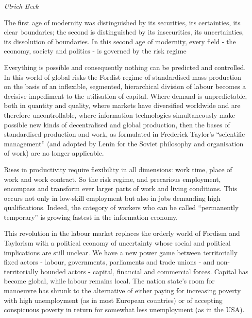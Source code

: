 \documentclass[
]{book}
\begin{document}
\emph{Ulrich Beck}

The first age of modernity was distinguished by its securities, its certainties, its clear boundaries; the second is distinguished by its insecurities, its uncertainties, its dissolution of boundaries. In this second age of modernity, every field - the economy, society and politics - is governed by the risk regime

Everything is possible and consequently nothing can be predicted and controlled. In this world of global risks the Fordist regime of standardised mass production on the basis of an inflexible, segmented, hierarchical division of labour becomes a decisive impediment to the utilisation of capital. Where demand is unpredictable, both in quantity and quality, where markets have diversified worldwide and are therefore uncontrollable, where information technologies simultaneously make possible new kinds of decentralised and global production, then the bases of standardised production and work, as formulated in Frederick Taylor's ``scientific management'' (and adopted by Lenin for the Soviet philosophy and organisation of work) are no longer applicable.

Rises in productivity require flexibility in all dimensions: work time, place of work and work contract. So the risk regime, and precarious employment, encompass and transform ever larger parts of work and living conditions. This occurs not only in low-skill employment but also in jobs demanding high qualifications. Indeed, the category of workers who can be called ``permanently temporary'' is growing fastest in the information economy.

This revolution in the labour market replaces the orderly world of Fordism and Taylorism with a political economy of uncertainty whose social and political implications are still unclear. We have a new power game between territorially fixed actors - labour, governments, parliaments and trade unions - and non-territorially bounded actors - capital, financial and commercial forces. Capital has become global, while labour remains local. The nation state's room for manoeuvre has shrunk to the alternative of either paying for increasing poverty with high unemployment (as in most European countries) or of accepting conspicuous poverty in return for somewhat less unemployment (as in the USA).
\end{document}
